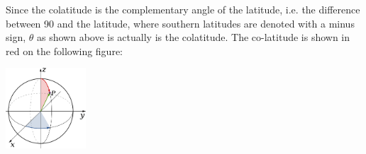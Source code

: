 Since the colatitude is the complementary angle of the latitude, 
i.e. the difference between 90 and the latitude, 
where southern latitudes are denoted with a minus sign,
$\theta$ as shown above is actually is the colatitude.
The co-latitude is shown in red on the following figure:
\begin{center}
\includegraphics[width=3cm]{images/colatitude}
\end{center}




